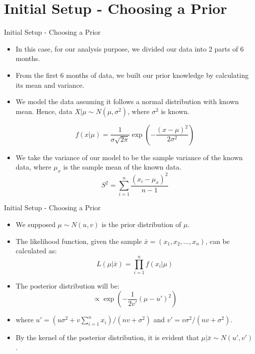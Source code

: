 \section{Initial Setup - Choosing a Prior}

\begin{frame}{Initial Setup - Choosing a Prior}

  \begin{itemize}
    \item In this case, for our analysis purpose, we divided our data into 2 parts of 6 months.
    \item From the first 6 months of data, we built our prior knowledge by calculating its mean and variance.
    \item We model the data assuming it follows a normal distribution with known mean.
Hence, data $X | \mu \sim N(\mu, \sigma^2)$, where $\sigma^2$ is known.

$$ f(x | \mu) = \frac{1}{\sigma \sqrt{2\pi}} \exp\left(-\frac{(x - \mu)^2}{2\sigma^2}\right) $$
    \item We take the variance of our model to be the sample variance of the known data, where $\mu_x$ is the sample mean of the known data.
        $$ S^2 = \sum_{i = 1}^{n} \frac{(x_i - \mu_x)^2}{n - 1} $$
  \end{itemize}
  
\end{frame}


\begin{frame}{Initial Setup - Choosing a Prior}

  \begin{itemize}
    \item We supposed $\mu \sim N(u, v)$ is the prior distribution of $\mu$.
    \item The likelihood function, given the sample $\bar{x} = (x_1, x_2, \dots, x_n)$, can be calculated as: $$ L(\mu | \bar{x}) = \prod_{i = 1}^{n} f(x_i | \mu)$$
    \item The posterior distribution will be: $$ \propto \exp\left(-\frac{1}{2v'} (\mu - u')^2\right)$$
    \item where $u' = \left(u \sigma^2 + v \sum_{i = 1}^{n} x_i\right) / (n v + \sigma^2)$ and $v' = v \sigma^2/(n v + \sigma^2)$.
    \item By the kernel of the posterior distribution, it is evident that $\mu | \bar{x} \sim N(u', v')$.
  \end{itemize}
  
\end{frame}
